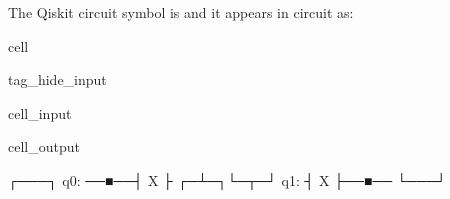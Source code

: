 \documentclass[letterpaper,10pt,english]{jupyterBook}
\begin{document}
\sphinxAtStartPar
The Qiskit circuit symbol is  and it appears in circuit as:

\begin{sphinxuseclass}{cell}
\begin{sphinxuseclass}{tag_hide_input}\begin{sphinxVerbatimInput}

\begin{sphinxuseclass}{cell_input}
\begin{sphinxVerbatim}[commandchars=\\\{\}]
   


\end{sphinxVerbatim}

\end{sphinxuseclass}\end{sphinxVerbatimInput}
\begin{sphinxVerbatimOutput}

\begin{sphinxuseclass}{cell_output}
\begin{sphinxVerbatim}[commandchars=\\\{\}]
          ┌───┐
q\PYGZus{}0: ──■──┤ X ├
     ┌─┴─┐└─┬─┘
q\PYGZus{}1: ┤ X ├──■──
     └───┘
\end{sphinxVerbatim}

\end{sphinxuseclass}\end{sphinxVerbatimOutput}

\end{sphinxuseclass}
\end{sphinxuseclass}
\end{document}
